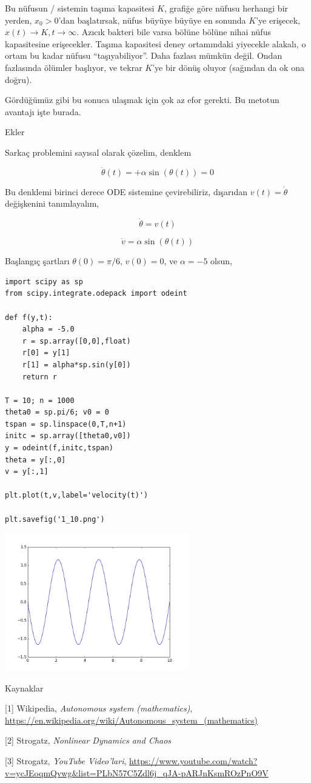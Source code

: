 \documentclass[12pt,fleqn]{article}\usepackage{../../common}
\begin{document}
Bu nüfusun / sistemin taşıma kapasitesi $K$, grafiğe göre nüfusu herhangi
bir yerden, $x_0 > 0$'dan başlatırsak, nüfus büyüye büyüye en sonunda
$K$'ye erişecek, $x(t) \to K, t \to \infty$. Azıcık bakteri bile varsa
bölüne bölüne nihai nüfus kapasitesine erişecekler. Taşıma kapasitesi
deney ortamındaki yiyecekle alakalı, o ortam bu kadar nüfusu
``taşıyabiliyor''. Daha fazlası mümkün değil. Ondan fazlasında ölümler
başlıyor, ve tekrar $K$'ye bir dönüş oluyor (sağından da ok ona doğru). 

Gördüğümüz gibi bu sonuca ulaşmak için çok az efor gerekti. Bu metotun
avantajı işte burada. 

Ekler

Sarkaç problemini sayısal olarak çözelim, denklem

$$ \ddot{\theta}(t) = + \alpha \sin(\theta(t)) = 0  $$

Bu denklemi birinci derece ODE sistemine çevirebiliriz, dışarıdan
$v(t) = \dot{\theta}$ değişkenini tanımlayalım, 

$$
\dot{\theta} = v(t)
$$

$$
\dot{v} = \alpha \sin (\theta(t))
$$

Başlangıç şartları $\theta(0) = \pi/6$, $v(0) = 0$, ve $\alpha = -5$ olsun,

\begin{verbatim}
import scipy as sp
from scipy.integrate.odepack import odeint

def f(y,t):
    alpha = -5.0
    r = sp.array([0,0],float)
    r[0] = y[1]
    r[1] = alpha*sp.sin(y[0])
    return r

T = 10; n = 1000
theta0 = sp.pi/6; v0 = 0
tspan = sp.linspace(0,T,n+1)
initc = sp.array([theta0,v0])
y = odeint(f,initc,tspan)
theta = y[:,0]
v = y[:,1]

plt.plot(t,v,label='velocity(t)')

plt.savefig('1_10.png')
\end{verbatim}

\includegraphics[height=6cm]{1_10.png}

Kaynaklar

[1] Wikipedia, {\em Autonomous system (mathematics)}, \url{https://en.wikipedia.org/wiki/Autonomous_system_(mathematics)}

[2] Strogatz, {\em Nonlinear Dynamics and Chaos}

[3] Strogatz, {\em YouTube Video'lari}, \url{https://www.youtube.com/watch?v=ycJEoqmQvwg&list=PLbN57C5Zdl6j_qJA-pARJnKsmROzPnO9V}
\end{document}
